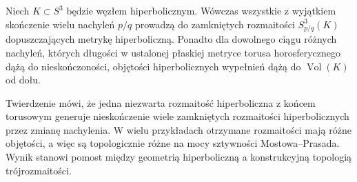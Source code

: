 \begin{twierdzenie}
Niech $K\subset S^3$ będzie węzłem hiperbolicznym.
Wówczas wszystkie z wyjątkiem skończenie wielu nachyleń
$p/q$ prowadzą do zamkniętych rozmaitości
$S^3_{p/q}(K)$ dopuszczających metrykę hiperboliczną.
Ponadto dla dowolnego ciągu różnych nachyleń, których
długości w ustalonej płaskiej metryce torusa horosferycznego
dążą do nieskończoności, objętości hiperbolicznych wypełnień
dążą do $\operatorname{Vol}(K)$ od dołu.
\end{twierdzenie}

\begin{uwaga}
Twierdzenie mówi, że jedna niezwarta rozmaitość hiperboliczna
z końcem torusowym generuje nieskończenie wiele zamkniętych
rozmaitości hiperbolicznych przez zmianę nachylenia.
W wielu przykładach otrzymane rozmaitości mają różne
objętości, a więc są topologicznie różne na mocy sztywności
Mostowa--Prasada. Wynik stanowi pomost między geometrią
hiperboliczną a konstrukcyjną topologią trójrozmaitości.
\end{uwaga}




